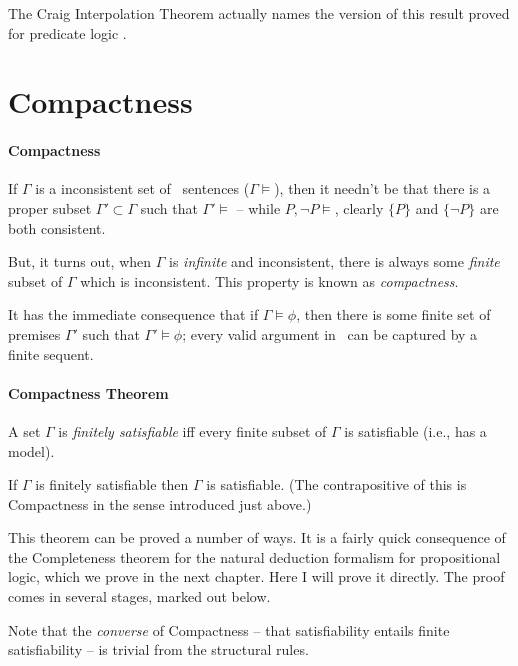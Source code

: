 The Craig Interpolation Theorem actually names the version of this result proved for predicate logic  \citep{crathrush}.


\section{Compactness}


\paragraph{Compactness}

If $\Gamma$ is a inconsistent set of \lone\ sentences ($\Gamma\vDash$), then it needn't be that there is a proper subset $\Gamma' \subset \Gamma$ such that $\Gamma'\vDash$ – while $P,\neg P\vDash$, clearly $\{P\}$ and $\{\neg P\}$ are both consistent.

But, it turns out, when $\Gamma$ is \emph{infinite} and inconsistent, there is always some \emph{finite} subset of $\Gamma$ which is inconsistent. This property is known as \emph{compactness}. 

It has the immediate consequence that if $\Gamma\vDash\phi$, then there is some finite set of premises $\Gamma'$ such that $\Gamma'\vDash\phi$; every valid argument in \lone\ can be captured by a finite sequent.

\paragraph{Compactness Theorem}

A set $\Gamma$ is \emph{finitely satisfiable} iff every finite subset of $\Gamma$ is satisfiable (i.e., has a model).
 
\begin{theorem}[Compactness]\label{compact}
If $\Gamma$ is finitely satisfiable then $\Gamma$ is satisfiable. (The contrapositive of this is Compactness in the sense introduced just above.)	
\end{theorem}

This theorem can be proved a number of ways. It is a fairly quick consequence of the Completeness theorem for the natural deduction formalism for propositional logic, which we  prove in the next chapter. Here I will prove it directly. The proof comes in several stages, marked out below.

Note that the \emph{converse} of Compactness – that satisfiability entails finite satisfiability – is trivial from the structural rules.

